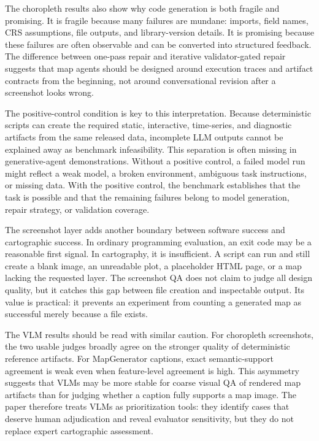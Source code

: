 \documentclass[]{interact}
\begin{document}
The choropleth results also show why code generation is both fragile and promising. It is fragile because many failures are mundane: imports, field names, CRS assumptions, file outputs, and library-version details. It is promising because these failures are often observable and can be converted into structured feedback. The difference between one-pass repair and iterative validator-gated repair suggests that map agents should be designed around execution traces and artifact contracts from the beginning, not around conversational revision after a screenshot looks wrong.

The positive-control condition is key to this interpretation. Because deterministic scripts can create the required static, interactive, time-series, and diagnostic artifacts from the same released data, incomplete LLM outputs cannot be explained away as benchmark infeasibility. This separation is often missing in generative-agent demonstrations. Without a positive control, a failed model run might reflect a weak model, a broken environment, ambiguous task instructions, or missing data. With the positive control, the benchmark establishes that the task is possible and that the remaining failures belong to model generation, repair strategy, or validation coverage.

The screenshot layer adds another boundary between software success and cartographic success. In ordinary programming evaluation, an exit code may be a reasonable first signal. In cartography, it is insufficient. A script can run and still create a blank image, an unreadable plot, a placeholder HTML page, or a map lacking the requested layer. The screenshot QA does not claim to judge all design quality, but it catches this gap between file creation and inspectable output. Its value is practical: it prevents an experiment from counting a generated map as successful merely because a file exists.

The VLM results should be read with similar caution. For choropleth screenshots, the two usable judges broadly agree on the stronger quality of deterministic reference artifacts. For MapGenerator captions, exact semantic-support agreement is weak even when feature-level agreement is high. This asymmetry suggests that VLMs may be more stable for coarse visual QA of rendered map artifacts than for judging whether a caption fully supports a map image. The paper therefore treats VLMs as prioritization tools: they identify cases that deserve human adjudication and reveal evaluator sensitivity, but they do not replace expert cartographic assessment.
\end{document}
